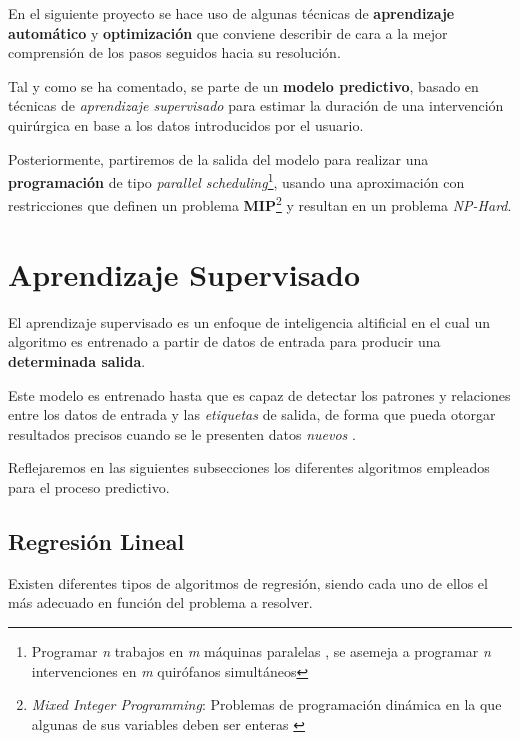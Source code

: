 
En el siguiente proyecto se hace uso de algunas técnicas de \textbf{aprendizaje automático} y \textbf{optimización} que conviene describir de cara a la mejor comprensión de los pasos seguidos hacia su resolución.

Tal y como se ha comentado, se parte de un \textbf{modelo predictivo}, basado en técnicas de \textit{aprendizaje supervisado} para estimar la duración de una intervención quirúrgica en base a los datos introducidos por el usuario.

Posteriormente, partiremos de la salida del modelo para realizar una \textbf{programación} de tipo \textit{parallel scheduling}\footnote{Programar \textit{n} trabajos en \textit{m} máquinas paralelas \cite{Xing2000ParallelJobs}, se asemeja a programar \textit{n} intervenciones en \textit{m} quirófanos simultáneos}, usando una aproximación con restricciones que definen un problema \textbf{MIP}\footnote{\textit{Mixed Integer Programming}: Problemas de programación dinámica en la que algunas de sus variables deben ser enteras  \cite{RichardsMixed-integerControl}} \cite{Lin2020AScheduling}  y resultan en un problema \textit{NP-Hard}.



\section{Aprendizaje Supervisado}

El aprendizaje supervisado es un enfoque de inteligencia altificial en el cual un algoritmo es entrenado a partir de datos de entrada para producir una \textbf{determinada salida}. 

Este modelo es entrenado hasta que es capaz de detectar los patrones y relaciones entre los datos de entrada y las \textit{etiquetas} de salida, de forma que pueda otorgar resultados precisos cuando se le presenten datos \textit{nuevos} \cite{PeterssonSupervisedLearning}.

Reflejaremos en las siguientes subsecciones los diferentes algoritmos empleados para el proceso predictivo.

\subsection{Regresión Lineal}

Existen diferentes tipos de algoritmos de regresión, siendo cada uno de ellos el más adecuado en función del problema a resolver.

